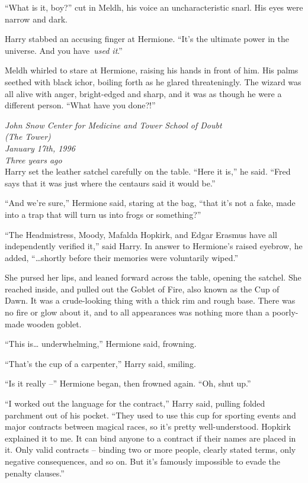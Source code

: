 ``What is it, boy?'' cut in Meldh, his voice an uncharacteristic snarl.
His eyes were narrow and dark.

Harry stabbed an accusing finger at Hermione. ``It's the ultimate power
in the universe. And you have~\emph{used it}.''

Meldh whirled to stare at Hermione, raising his hands in front of him.
His palms seethed with black ichor, boiling forth as he glared
threateningly. The wizard was all alive with anger, bright-edged and
sharp, and it was as though he were a different person. ``What have you
done?!''

\mybreak

\emph{John Snow Center for Medicine and Tower School of Doubt\\
(The Tower)}\\
\emph{January 17th, 1996}\\
\emph{Three years ago}\\

Harry set the leather satchel carefully on the table. ``Here it is,'' he
said. ``Fred says that it was just where the centaurs said it would
be.''

``And we're sure,'' Hermione said, staring at the bag, ``that it's not a
fake, made into a trap that will turn us into frogs or something?''

``The Headmistress, Moody, Mafalda Hopkirk, and Edgar Erasmus have all
independently verified it,'' said Harry. In answer to Hermione's raised
eyebrow, he added, ``\ldots shortly before their memories were
voluntarily wiped.''

She pursed her lips, and leaned forward across the table, opening the
satchel. She reached inside, and pulled out the Goblet of Fire, also
known as the Cup of Dawn. It was a crude-looking thing with a thick rim
and rough base. There was no fire or glow about it, and to all
appearances was nothing more than a poorly-made wooden goblet.

``This is\ldots{} underwhelming,'' Hermione said, frowning.

``That's the cup of a carpenter,'' Harry said, smiling.

``Is it really --'' Hermione began, then frowned again. ``Oh, shut up.''

``I worked out the language for the contract,'' Harry said, pulling
folded parchment out of his pocket. ``They used to use this cup for
sporting events and major contracts between magical races, so it's
pretty well-understood. Hopkirk explained it to me. It can bind anyone
to a contract if their names are placed in it. Only valid contracts --
binding two or more people, clearly stated terms, only negative
consequences, and so on. But it's famously impossible to evade the
penalty clauses.''

